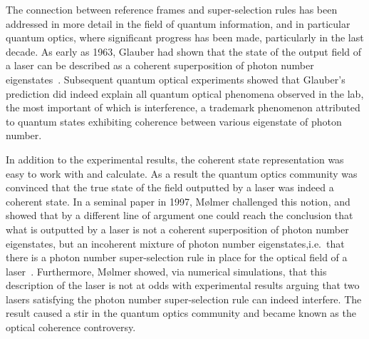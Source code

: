 \documentclass{article}
\begin{document}
The connection between reference frames and super-selection rules has been addressed in more detail in the field of quantum information, and in particular quantum optics, where significant progress has been made, particularly in the last decade. As early as 1963,  Glauber had shown that the state of the output field of a laser can be described as a coherent superposition of photon number eigenstates~\cite{G63}. Subsequent quantum optical experiments showed that Glauber's prediction did indeed explain all quantum optical phenomena observed in the lab, the most important of which is interference, a trademark phenomenon attributed to quantum states exhibiting coherence between various eigenstate of photon number.  

In addition to the experimental results, the coherent state representation was easy to work with and calculate.  As a result the quantum optics community was convinced that the true state of the field outputted by a laser was indeed a coherent state.  In a seminal paper in 1997, M{\o}lmer challenged this notion, and showed that by a different line of argument one could reach the conclusion that what is outputted by a laser is not a coherent superposition of photon number eigenstates, but an incoherent mixture of photon number eigenstates,i.e.~that there is a photon number super-selection rule in place for the optical field of a laser~\cite{M97}.  Furthermore, M{\o}lmer showed, via numerical simulations, that this description of the laser is not at odds with experimental results arguing that two lasers satisfying the photon number super-selection rule can indeed interfere.  The result caused a stir in the quantum optics community and became known as the optical coherence controversy.
\end{document}
